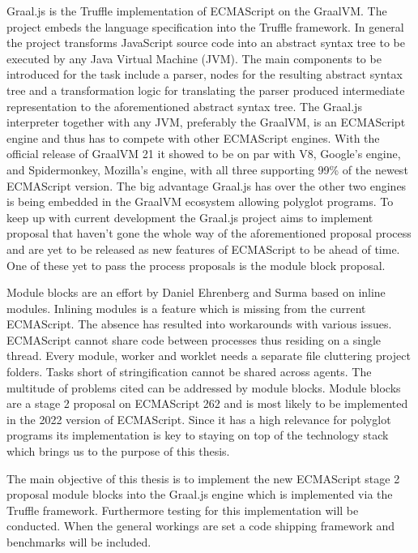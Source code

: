 Graal.js is the Truffle implementation of ECMAScript on the GraalVM. The project embeds the language specification into the Truffle framework. In general the project transforms JavaScript source code into an abstract syntax tree to be executed by any Java Virtual Machine (JVM). \cite{Graaljs} The main components to be introduced for the task include a parser, nodes for the resulting abstract syntax tree and a transformation logic for translating the parser produced intermediate representation to the aforementioned abstract syntax tree. The Graal.js interpreter together with any JVM, preferably the GraalVM, is an ECMAScript engine and thus has to compete with other ECMAScript engines. With the official release of GraalVM 21 it showed to be on par with V8, Google's engine, and Spidermonkey, Mozilla's engine, with all three supporting 99\% of the newest ECMAScript version. \cite{kangax1} The big advantage Graal.js has over the other two engines is being embedded in the GraalVM ecosystem allowing polyglot programs. To keep up with current development the Graal.js project aims to implement proposal that haven't gone the whole way of the aforementioned proposal process and are yet to be released as new features of ECMAScript to be ahead of time. One of these yet to pass the process proposals is the module block proposal.

Module blocks are an effort by Daniel Ehrenberg and Surma based on inline modules. Inlining modules is a feature which is missing from the current ECMAScript. The absence has resulted into workarounds with various issues. ECMAScript cannot share code between processes thus residing on a single thread. Every module, worker and worklet needs a separate file cluttering project folders. Tasks short of stringification cannot be shared across agents. The multitude of problems cited can be addressed by module blocks. Module blocks are a stage 2 proposal on ECMAScript 262 and is most likely to be implemented in the 2022 version of ECMAScript. \cite{gitMB} Since it has a high relevance for polyglot programs its implementation is key to staying on top of the technology stack which brings us to the purpose of this thesis.

The main objective of this thesis is to implement the new ECMAScript stage 2 proposal module blocks into the Graal.js engine which is implemented via the Truffle framework. Furthermore testing for this implementation will be conducted. When the general workings are set a code shipping framework and benchmarks will be included.

